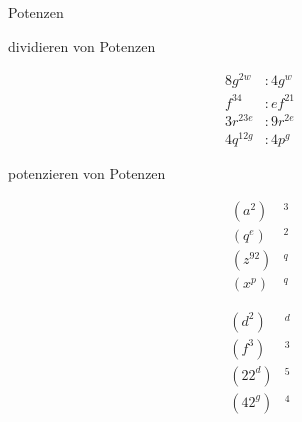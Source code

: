 \documentclass[12pt]{article}
\begin{document}
\begin{section}{Potenzen}
\begin{subsection}{dividieren von Potenzen}
\begin{multicols}{2}
		\begin{align*}
		8g^{2w}		&: 		4g^{w}		\\
		f^{34}		&:		ef^{21}		\\
		3r^{23e}	&:		9r^{2e}		\\
		4q^{12g}	&:		4p^{g}
		\end{align*}
	\end{multicols}
	\end{subsection}
	
	\begin{subsection}{potenzieren von Potenzen}
	\begin{multicols}{2}
		\begin{align*}
		(a^{2})		&^		{3} 		\\
		(q^{e})		&^		{2} 		\\
		(z^{92})	&^		{q} 		\\
		(x^{p})		&^		{q} 
		\end{align*}

		\begin{align*}
		(d^{2})		&^		{d} 		\\
		(f^{3})		&^		{3} 		\\
		(22^{d})	&^		{5} 		\\
		(42^{g})	&^		{4}
		\end{align*}
	\end{multicols}
	\end{subsection}	
\end{section}
\end{document}
